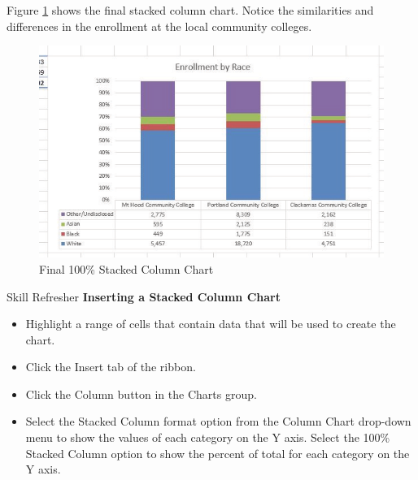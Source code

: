 Figure \ref{04:fig26} shows the final stacked column chart. Notice the similarities and differences in the enrollment at the local community colleges.

\begin{figure}[H]
	\centering
	\includegraphics[width=\maxwidth{.95\linewidth}]{gfx/ch04_fig26}
	\caption{Final 100\% Stacked Column Chart}
	\label{04:fig26}
\end{figure}

\begin{center}
	\begin{sklbox}{Skill Refresher}
		\textbf{Inserting a Stacked Column Chart}
		\\
		\begin{itemize}
			\setlength{\itemsep}{0pt}
			\setlength{\parskip}{0pt}
			\setlength{\parsep}{0pt}

			\item Highlight a range of cells that contain data that will be used to create the chart.
			\item Click the Insert tab of the ribbon.
			\item Click the Column button in the Charts group.
			\item Select the Stacked Column format option from the Column Chart drop-down menu to show the values of each category on the Y axis. Select the 100\% Stacked Column option to show the percent of total for each category on the Y axis.
			
		\end{itemize}
	\end{sklbox}
\end{center}

